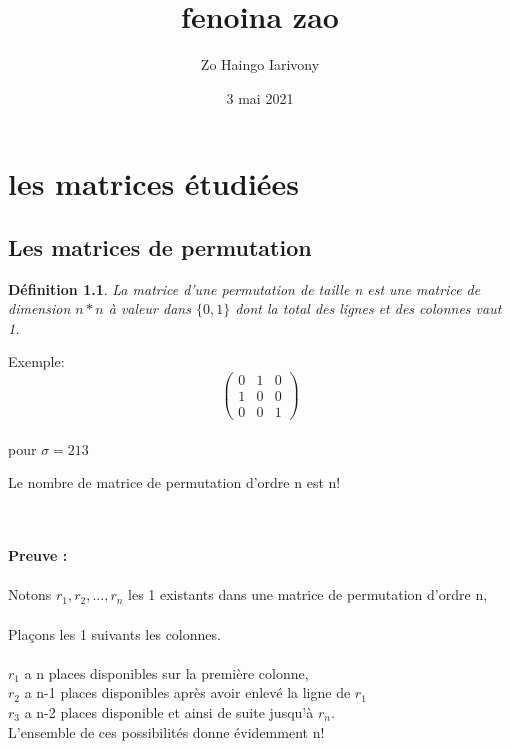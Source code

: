 \documentclass{book}
\title{fenoina zao}
\author{Zo Haingo Iarivony \bsc{Rakotoarisoa}}
\date{3 mai 2021}
\newtheorem{petit_nom2}{Définition}[chapter]
\begin{document}
\maketitle
\chapter{les matrices étudiées}
\section{Les matrices de permutation}
\begin{petit_nom2}
La matrice d'une permutation de taille n est une matrice de dimension $n * n$ à valeur dans $\{0,1\}$ dont la total des lignes et des colonnes vaut 1.\\
\end{petit_nom2} 

Exemple: \\
\begin{equation}
\begin{pmatrix}
 0&1&0\\1&0&0\\0&0&1
 \end{pmatrix}
\end{equation}
\\
 pour $\sigma=213$ \\
\begin{theorem}
Le nombre de matrice de permutation d'ordre n est n!
\end{theorem} \\\\
\textbf{Preuve : }\\\\
Notons $r_1, r_2, ..., r_n$ les 1 existants dans une matrice de permutation d'ordre n,\\\\ Plaçons les 1 suivants les colonnes. \\\\
$r_1$ a n places disponibles sur la première colonne,\\ $r_2$ a n-1 places disponibles après avoir enlevé la ligne de $r_1$\\
$r_3$ a n-2 places disponible et ainsi de suite jusqu'à $r_n$. 
\\L'ensemble de ces possibilités donne évidemment n!
\end{document}
